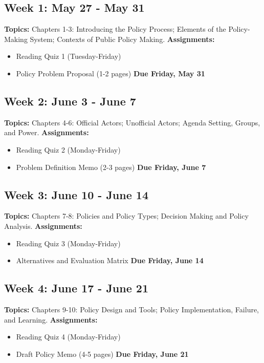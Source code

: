 \documentclass[11pt, letterpaper]{article}
\begin{document}
\subsection*{Week 1: May 27 - May 31}
\textbf{Topics:} \newline
Chapters 1-3: Introducing the Policy Process; Elements of the Policy-Making System; Contexts of Public Policy Making.\newline
\textbf{Assignments:} \begin{itemize}
  \item Reading Quiz 1 (Tuesday-Friday)
  \item Policy Problem Proposal (1-2 pages) \textbf{Due Friday, May 31}
\end{itemize}

\subsection*{Week 2: June 3 - June 7}
\textbf{Topics:} \newline
Chapters 4-6: Official Actors; Unofficial Actors; Agenda Setting, Groups, and Power.\newline
\textbf{Assignments:} \begin{itemize}
  \item Reading Quiz 2 (Monday-Friday)
  \item Problem Definition Memo (2-3 pages) \textbf{Due Friday, June 7}
\end{itemize}

\subsection*{Week 3: June 10 - June 14}
\textbf{Topics:} \newline
Chapters 7-8: Policies and Policy Types; Decision Making and Policy Analysis.\newline
\textbf{Assignments:} \begin{itemize}
  \item Reading Quiz 3 (Monday-Friday)
  \item Alternatives and Evaluation Matrix \textbf{Due Friday, June 14}
\end{itemize}

\subsection*{Week 4: June 17 - June 21}
\textbf{Topics:} \newline
Chapters 9-10: Policy Design and Tools; Policy Implementation, Failure, and Learning.\newline
\textbf{Assignments:} \begin{itemize}
  \item Reading Quiz 4 (Monday-Friday)
  \item Draft Policy Memo (4-5 pages) \textbf{Due Friday, June 21}
\end{itemize}
\end{document}

